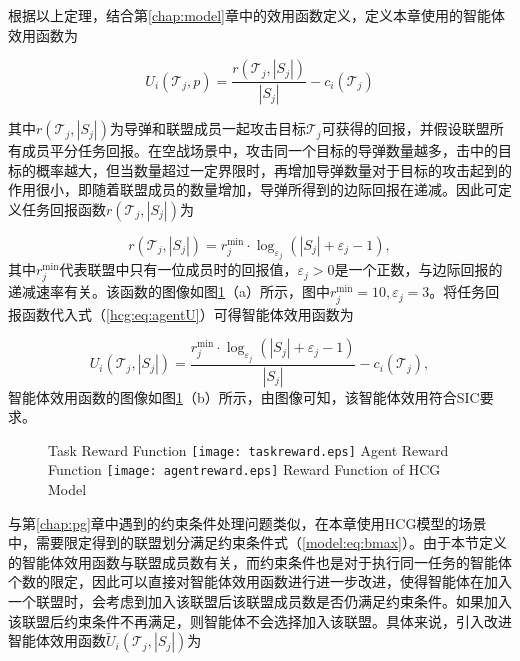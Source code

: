 根据以上定理，结合第\ref{chap:model}章中的效用函数定义，定义本章使用的智能体效用函数为

\begin{equation}
\label{hcg:eq:agentU}
	U_i(\mathcal{T}_j,p) = \frac{r(\mathcal{T}_j,|S_j|)}{|S_j|} - c_i(\mathcal{T}_j)
\end{equation}

其中$r(\mathcal{T}_j,|S_j|)$为导弹和联盟成员一起攻击目标$\mathcal{T}_j$可获得的回报，并假设联盟所有成员平分任务回报。在空战场景中，攻击同一个目标的导弹数量越多，击中的目标的概率越大，但当数量超过一定界限时，再增加导弹数量对于目标的攻击起到的作用很小，即随着联盟成员的数量增加，导弹所得到的边际回报在递减。因此可定义任务回报函数$r(\mathcal{T}_j,|S_j|)$为

\begin{equation}
\label{hcg:eq:task_reward}
	r(\mathcal{T}_j,|S_j|) = r_j^{\text{min}} \cdot \log_{\varepsilon_j} (|S_j|+\varepsilon_j-1),
\end{equation}
其中$r_j^{\text{min}}$代表联盟中只有一位成员时的回报值，$\varepsilon_j>0$是一个正数，与边际回报的递减速率有关。该函数的图像如图\ref{hcg:fig:rewardfunc}（a）所示，图中$r_j^{\text{min}}=10, \varepsilon_j = 3$。将任务回报函数代入式（\ref{hcg:eq:agentU}）可得智能体效用函数为

\begin{equation}
\label{hcg:eq:agentU_reward}
	U_i(\mathcal{T}_j,|S_j|) = \frac{r_j^{\text{min}} \cdot \log_{\varepsilon_j} (|S_j|+\varepsilon_j-1)}{|S_j|} - c_i(\mathcal{T}_j),
\end{equation}
智能体效用函数的图像如图\ref{hcg:fig:rewardfunc}（b）所示，由图像可知，该智能体效用符合SIC要求。

\begin{figure}[!hbtp]
  \centering
                  {Task Reward Function}%
                  {\texttt{[image: taskreward.eps]}}
  \hspace{2cm}
                  {Agent Reward Function}%
                  {\texttt{[image: agentreward.eps]}}
            {Reward Function of HCG Model}
  \label{hcg:fig:rewardfunc}
\end{figure}

与第\ref{chap:pg}章中遇到的约束条件处理问题类似，在本章使用HCG模型的场景中，需要限定得到的联盟划分满足约束条件式（\ref{model:eq:bmax}）。由于本节定义的智能体效用函数与联盟成员数有关，而约束条件也是对于执行同一任务的智能体个数的限定，因此可以直接对智能体效用函数进行进一步改进，使得智能体在加入一个联盟时，会考虑到加入该联盟后该联盟成员数是否仍满足约束条件。如果加入该联盟后约束条件不再满足，则智能体不会选择加入该联盟。具体来说，引入改进智能体效用函数$\widetilde U_i(\mathcal{T}_j,|S_j|)$为

